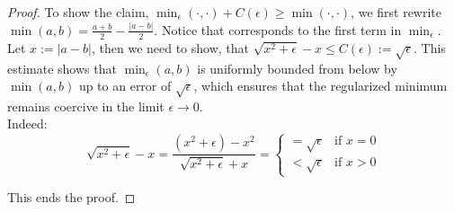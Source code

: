 \documentclass[12pt,openany]{book}
\theoremstyle{plainnormal}
\theoremstyle{remark}
\begin{document}
\begin{proof}
To show the claim, $\min_\epsilon(\cdot, \cdot) + C(\epsilon) \geq \min(\cdot, \cdot)$, we first rewrite $\min(a,b) = \frac{a+b}{2} - \frac{|a-b|}{2}$. Notice that corresponds to the first term in $\min_\epsilon$. Let $x := |a-b|$, then we need to show, that $\sqrt{x^2 + \epsilon } -x \leq C(\epsilon) := \sqrt{\epsilon}$. This estimate shows that \(\min_\epsilon(a, b)\) is uniformly bounded from below by \(\min(a, b)\) up to an error of \(\sqrt{\epsilon}\), 
which ensures that the regularized minimum remains coercive in the limit \(\epsilon \to 0\). \\
Indeed: $$\sqrt{x^2 + \epsilon } -x = \frac{(x^2+\epsilon) - x^2}{\sqrt{x^2+\epsilon} + x} = 
\begin{cases}
= \sqrt{\epsilon} & \text{if } x = 0 \\
< \sqrt{\epsilon} & \text{if } x > 0
\end{cases}$$

This ends the proof.
\end{proof}
\clearpage
\end{document}
